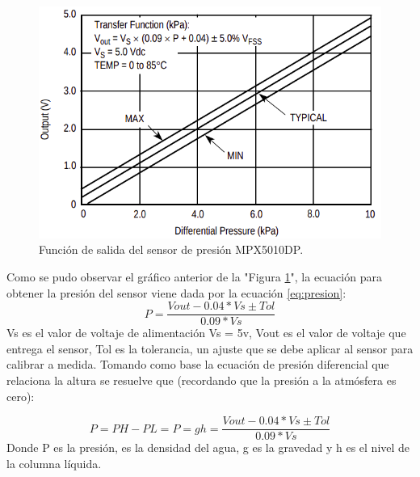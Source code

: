 \begin{figure}
\centering
\includegraphics[scale=.55]{./Figures/SalidaMPX5010DP.png}
\caption{Función de salida del sensor de presión MPX5010DP.}
\label{fig:función de salida del sensor}
\end{figure}
Como se pudo observar el gráfico anterior de la "Figura \ref{fig:función de salida del sensor}", la ecuación para obtener la presión del sensor viene dada por la ecuación \ref{eq:presion}:
\begin{equation}
 \label{eq:presion}
 P = \frac{Vout- 0.04*Vs \pm Tol}{0.09*Vs}
\end{equation}
Vs es el valor de voltaje de alimentación Vs = 5v, Vout es el valor de voltaje que entrega el sensor, Tol es la tolerancia, un ajuste que se debe aplicar al sensor para  calibrar a medida.
Tomando como base la ecuación de presión diferencial que relaciona la altura se resuelve que (recordando que la presión a la atmósfera es cero):  

\begin{equation}
 \label{eq:presión}
	 P =PH -PL= P = gh =\frac{Vout- 0.04*Vs \pm Tol}{0.09*Vs}	
\end{equation}
 Donde P es la presión,  es la densidad del agua, g es la gravedad y h es el nivel de la columna líquida.

